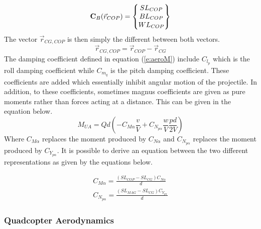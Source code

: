 \begin{equation}
{\bf C}_B(\vec{r}_{COP}) = \begin{Bmatrix} SL_{COP} \\ BL_{COP} \\ WL_{COP} \end{Bmatrix}
\end{equation}
The vector $\vec{r}_{CG,COP}$ is then simply the different between
both vectors.
\begin{equation}
\vec{r}_{CG,COP} = \vec{r}_{COP}-\vec{r}_{CG}
\end{equation}
The damping coefficient defined in equation (\ref{e:aeroM})
include $C_{l_p}$ which is the roll damping coefficient while $C_{m_q}$ is the pitch damping
coefficient. These coefficients are added which essentially inhibit
angular motion of the projectile. In addition, to these coefficients,
sometimes magnus coefficients are given as pure moments rather 
than forces acting at a distance. This can be given in the equation
below. 
\begin{equation}
M_{UA} = Qd (-C_{M\alpha}\frac{v}{V} + C_{N_{p\alpha}}\frac{w}{V}\frac{pd}{2V})
\end{equation}
Where $C_{M\alpha}$ replaces the moment produced by $C_{N\alpha}$ and
$C_{N_{p\alpha}}$ replaces the moment produced by
$C_{Y_{p\alpha}}$. It is possible to derive an equation between the
two different representations as given by the equations below.

\begin{equation}
\begin{matrix}
C_{M\alpha} = \frac{(SL_{COP}-SL_{CG})C_{N\alpha}}{d} \\
C_{N_{p\alpha}} = \frac{(SL_{MAG}-SL_{CG})C_{Y_{p\alpha}}}{d}
\end{matrix}
\end{equation}

\subsubsection{Quadcopter Aerodynamics}

